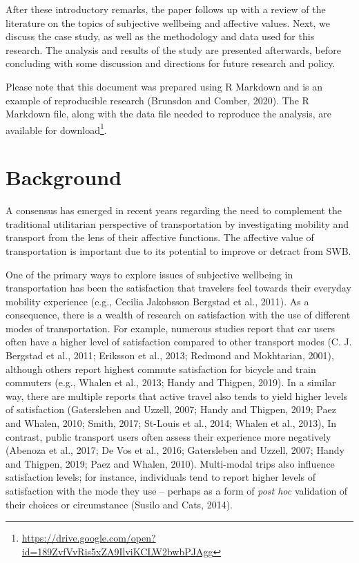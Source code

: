 \documentclass[]{elsarticle} %
\begin{document}
After these introductory remarks, the paper follows up with a review of
the literature on the topics of subjective wellbeing and affective
values. Next, we discuss the case study, as well as the methodology and
data used for this research. The analysis and results of the study are
presented afterwards, before concluding with some discussion and
directions for future research and policy.

Please note that this document was prepared using R Markdown and is an
example of reproducible research (Brunsdon and Comber, 2020). The R
Markdown file, along with the data file needed to reproduce the
analysis, are available for
download\footnote{\url{https://drive.google.com/open?id=189ZvfVvRis5xZA9IlviKCLW2bwbPJAgg}}.

\hypertarget{background}{%
\section{Background}\label{background}}

A consensus has emerged in recent years regarding the need to complement
the traditional utilitarian perspective of transportation by
investigating mobility and transport from the lens of their affective
functions. The affective value of transportation is important due to its
potential to improve or detract from SWB.

One of the primary ways to explore issues of subjective wellbeing in
transportation has been the satisfaction that travelers feel towards
their everyday mobility experience (e.g., Cecilia Jakobsson Bergstad et
al., 2011). As a consequence, there is a wealth of research on
satisfaction with the use of different modes of transportation. For
example, numerous studies report that car users often have a higher
level of satisfaction compared to other transport modes (C. J. Bergstad
et al., 2011; Eriksson et al., 2013; Redmond and Mokhtarian, 2001),
although others report highest commute satisfaction for bicycle and
train commuters (e.g., Whalen et al., 2013; Handy and Thigpen, 2019). In
a similar way, there are multiple reports that active travel also tends
to yield higher levels of satisfaction (Gatersleben and Uzzell, 2007;
Handy and Thigpen, 2019; Paez and Whalen, 2010; Smith, 2017; St-Louis et
al., 2014; Whalen et al., 2013), In contrast, public transport users
often assess their experience more negatively (Abenoza et al., 2017; De
Vos et al., 2016; Gatersleben and Uzzell, 2007; Handy and Thigpen, 2019;
Paez and Whalen, 2010). Multi-modal trips also influence satisfaction
levels; for instance, individuals tend to report higher levels of
satisfaction with the mode they use -- perhaps as a form of \emph{post
hoc} validation of their choices or circumstance (Susilo and Cats,
2014).
\end{document}

